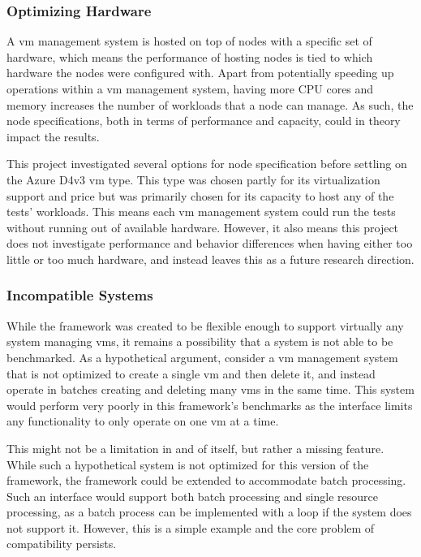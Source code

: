 \documentclass{kththesis}
\begin{document}
\begin{enumerate}
\subsubsection{Optimizing Hardware}
A \Gls{vm} management system is hosted on top of nodes with a specific set of hardware, which means the performance of hosting nodes is tied to which hardware the nodes were configured with. Apart from potentially speeding up operations within a \Gls{vm} management system, having more CPU cores and memory increases the number of workloads that a node can manage. As such, the node specifications, both in terms of performance and capacity, could in theory impact the results. 

This project investigated several options for node specification before settling on the Azure D4v3 \Gls{vm} type. This type was chosen partly for its virtualization support and price but was primarily chosen for its capacity to host any of the tests' workloads. This means each \Gls{vm} management system could run the tests without running out of available hardware. However, it also means this project does not investigate performance and behavior differences when having either too little or too much hardware, and instead leaves this as a future research direction. 

\subsubsection{Incompatible Systems}
While the framework was created to be flexible enough to support virtually any system managing \Glspl{vm}, it remains a possibility that a system is not able to be benchmarked. As a hypothetical argument, consider a \Gls{vm} management system that is not optimized to create a single \Gls{vm} and then delete it, and instead operate in batches creating and deleting many \Glspl{vm} in the same time. This system would perform very poorly in this framework's benchmarks as the interface limits any functionality to only operate on one \Gls{vm} at a time. 

This might not be a limitation in and of itself, but rather a missing feature. While such a hypothetical system is not optimized for this version of the framework, the framework could be extended to accommodate batch processing. Such an interface would support both batch processing and single resource processing, as a batch process can be implemented with a loop if the system does not support it. However, this is a simple example and the core problem of compatibility persists.


\end{enumerate}
\end{document}
